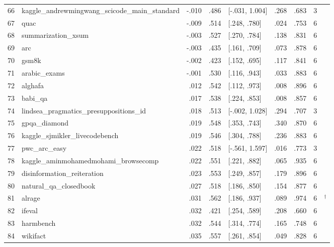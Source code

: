 \begin{longtable}{@{}r>{\raggedright\arraybackslash}p{}rrlrrr>{\raggedright\arraybackslash}p{}@{}}
66 & kaggle\_andrewmingwang\_scicode\_main\_standard & -.010 & .486 & [-.031, 1.004] & .268 & .683 & 3 & \citealp{tian2024scicode} \\
67 & quac & -.009 & .514 & [.248, .780] & .024 & .753 & 6 & \citealp{choi2018quac} \\
68 & summarization\_xsum & -.003 & .527 & [.270, .784] & .138 & .831 & 6 & \citealp{narayan2018dont} \\
69 & arc & -.003 & .435 & [.161, .709] & .073 & .878 & 6 & \citealp{clark2018think} \\
70 & gsm8k & -.002 & .423 & [.152, .695] & .117 & .841 & 6 & \citealp{cobbe2021training} \\
71 & arabic\_exams & -.001 & .530 & [.116, .943] & .033 & .883 & 6 & \citealp{hardalov2020exams} \\
72 & alghafa & .012 & .542 & [.112, .973] & .008 & .896 & 6 & \citealp{almazrouei2023alghafa} \\
73 & babi\_qa & .017 & .538 & [.224, .853] & .008 & .857 & 6 & \citealp{weston2015ai} \\
74 & lindsea\_pragmatics\_presuppositions\_id & .018 & .513 & [-.002, 1.028] & .294 & .707 & 3 & \citealp{leong2023bhasa} \\
75 & gpqa\_diamond & .019 & .548 & [.353, .743] & .340 & .870 & 6 & \citealp{rein2023gpqa} \\
76 & kaggle\_sjmikler\_livecodebench & .019 & .546 & [.304, .788] & .236 & .883 & 6 & \citealp{jain2024livecodebench} \\
77 & pwc\_arc\_easy & .022 & .518 & [-.561, 1.597] & .016 & .773 & 3 & \citealp{clark2018think} \\
78 & kaggle\_aminmohamedmohami\_browsecomp & .022 & .551 & [.221, .882] & .065 & .935 & 6 & \citealp{wei2025browsecomp} \\
79 & disinformation\_reiteration & .023 & .553 & [.249, .857] & .179 & .896 & 6 & \citealp{helm2023} \\
80 & natural\_qa\_closedbook & .027 & .518 & [.186, .850] & .154 & .877 & 6 & \citealp{kwiatkowski2019natural} \\
81 & alrage & .031 & .562 & [.186, .937] & .089 & .974 & 6 & \citealp{helm_arabic}$^\dagger$ \\
82 & ifeval & .032 & .421 & [.254, .589] & .208 & .660 & 6 & \citealp{zhou2023instruction} \\
83 & harmbench & .032 & .544 & [.314, .774] & .165 & .748 & 6 & \citealp{mazeika2024harmbench} \\
84 & wikifact & .035 & .557 & [.261, .854] & .049 & .828 & 6 & \citealp{helm2023} \\

\end{longtable}
